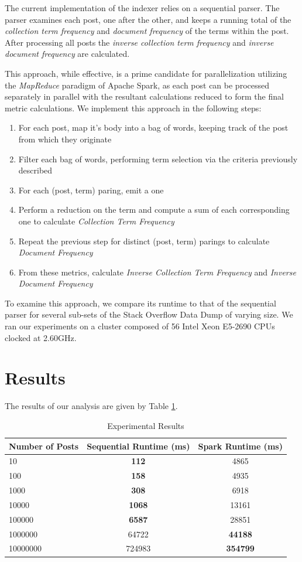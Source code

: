 \documentclass[conference]{IEEEtran}
\newcommand{\so}{Stack Overflow\xspace}
\begin{document}
The current implementation of the indexer relies on a sequential parser.  The parser examines each post, one after the other, and keeps a running total of the \textit{collection term frequency} and \textit{document frequency} of the terms within the post. After processing all posts the \textit{inverse collection term frequency} and \textit{inverse document frequency} are calculated.

This approach, while effective, is a prime candidate for parallelization utilizing the \textit{MapReduce} paradigm of Apache Spark, as each post can be processed separately in parallel with the resultant calculations reduced to form the final metric calculations. We implement this approach in the following steps:
\begin{enumerate}
	\item For each post, map it's body into a bag of words, keeping track of the post from which they originate
	\item Filter each bag of words, performing term selection via the criteria previously described
	\item For each (post, term) paring, emit a one
	\item Perform a reduction on the term and compute a sum of each corresponding one to calculate \textit{Collection Term Frequency}
	\item Repeat the previous step for distinct (post, term) parings to calculate \textit{Document Frequency}
	\item From these metrics, calculate \textit{Inverse Collection Term Frequency} and \textit{Inverse Document Frequency}
\end{enumerate}

To examine this approach, we compare its runtime to that of the sequential parser for several sub-sets of the \so Data Dump of varying size. We ran our experiments on a cluster composed of 56 Intel Xeon E5-2690 CPUs clocked at 2.60GHz.

\section{Results}
The results of our analysis are given by Table \ref{tab:results}. 
\begin{table}[ht]
	\caption{Experimental Results}
	\label{tab:results}
	\begin{tabular}{|l|c|c|}
	\hline
	Number of Posts & Sequential Runtime (ms) & Spark Runtime (ms) \\
	\hline
	10 & \textbf{112} & 4865 \\
	100 & \textbf{158} & 4935 \\
	1000 & \textbf{308} & 6918 \\
	10000 & \textbf{1068} & 13161 \\
	100000 & \textbf{6587} & 28851 \\
	1000000 & 64722 & \textbf{44188} \\
	10000000 & 724983 & \textbf{354799} \\
	\hline
	\end{tabular}
\end{table}
\end{document}
